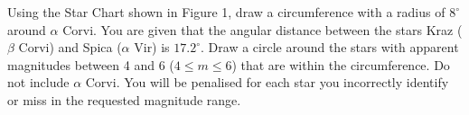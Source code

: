 Using the Star Chart shown in Figure 1, draw a circumference with a radius of
$8^\circ$ around $\alpha$ Corvi. You are given that the angular distance
between the stars Kraz ($\beta$ Corvi) and Spica ($\alpha$ Vir) is
$17.2^\circ$. Draw a circle around the stars with apparent magnitudes between
4 and 6 ($4 \le m \le 6$) that are within the circumference. Do not include
$\alpha$ Corvi. You will be penalised for each star you incorrectly identify
or miss in the requested magnitude range.

